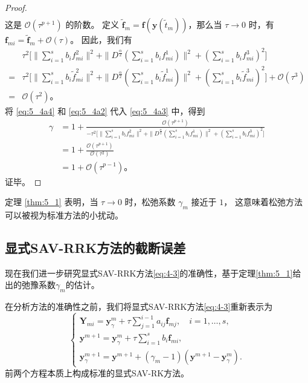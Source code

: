 \begin{proof}
\begin{align}
	\end{align}
	这是 $\mathcal{O}(\tau^{p+1})$ 的阶数。
	定义 $\tilde{\bm{f}}_m=\bm{f}\left(\bm{y}\left(\tilde{t}_m\right)\right)$，那么当 $\tau\rightarrow 0$ 时，有 $\bm{f}_{m i}=\tilde{\bm{f}}_m+\mathcal{O}(\tau)$。
	因此，我们有
	\begin{align}\label{eq:5_4a4}
		&\tau^2\Big[\|\sum\limits_{i=1}^{s}b_if_{mi}^2\|^2+ \|D^\frac{\alpha}{2}(\sum\limits_{i=1}^{s}b_if_{mi}^1)\|^2+(\sum\limits_{i=1}^{s}b_if_{mi}^3)^2\Big]\nonumber\\
		=&\tau^2\Big[\|\sum\limits_{i=1}^{s}b_i\tilde{f}_{mi}^2\|^2+ \|D^\frac{\alpha}{2}(\sum\limits_{i=1}^{s}b_i\tilde{f}_{mi}^1)\|^2+(\sum\limits_{i=1}^{s}b_i\tilde{f}_{mi}^3)^2\Big]+\mathcal{O}(\tau^3)\nonumber\\
		=&\mathcal{O}(\tau^2)。
	\end{align}
	将 \eqref{eq:5_4a4} 和 \eqref{eq:5_4a2} 代入 \eqref{eq:5_4a3} 中，得到
	\begin{align}\label{eq:5_4a5}
		\gamma&=1+\frac{\mathcal{O}(\tau^{p+1})}{-\tau^2\Big[\|\sum\limits_{i=1}^{s}b_if_{mi}^2\|^2+ \|D^\frac{\alpha}{2}(\sum\limits_{i=1}^{s}b_if_{mi}^1)\|^2+(\sum\limits_{i=1}^{s}b_if_{mi}^3)^2\Big]}\nonumber\\
		&=1+\frac{\mathcal{O}(\tau^{p+1})}{\mathcal{O}(\tau^2)}\nonumber\\
		&=1+\mathcal{O}(\tau^{p-1})。
	\end{align}
	证毕。
\end{proof}

\begin{remark}\label{rk:5_1}
	定理 \ref{thm:5_1} 表明，当 $\tau\rightarrow 0$ 时，松弛系数 $\gamma_m$ 接近于 $1$，
	这意味着松弛方法可以被视为标准方法的小扰动。
\end{remark}

\subsection{显式SAV-RRK方法的截断误差}
现在我们进一步研究显式SAV-RRK方法\eqref{eq:4-3}的准确性，基于定理\ref{thm:5_1}给出的弛豫系数$\gamma_m$的估计。

在分析方法的准确性之前，我们将显式SAV-RRK方法\eqref{eq:4-3}重新表示为
\begin{equation}
\left\{\begin{array}{l}
\bm{Y}_{m i}=\bm{y}_\gamma^m+\tau \sum\limits_{j=1}^{i-1} a_{i j} \bm{f}_{m j}, \quad i=1, \ldots, s, \\
\bm{y}^{m+1}=\bm{y}_\gamma^m+\tau \sum\limits_{i=1}^s b_i \bm{f}_{m i},\\
\bm{y}_\gamma^{m+1}=\bm{y}^{m+1}+\left(\gamma_m-1\right)\left(\bm{y}^{m+1}-\bm{y}_\gamma^m\right) .
\end{array}\right.\label{eq:4-321}
\end{equation}
前两个方程本质上构成标准的显式SAV-RK方法。

